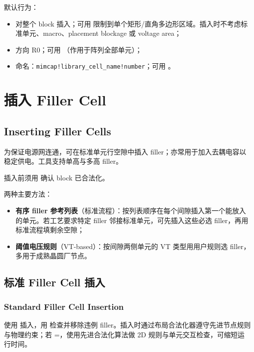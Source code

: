 默认行为：
\begin{itemize}
  \item 对整个 block 插入；可用  限制到单个矩形/直角多边形区域。插入时不考虑标准单元、macro、placement blockage 或 voltage area；
  \item 方向 R0；可用 （作用于阵列全部单元）；
  \item 命名：\texttt{mimcap!library\_cell\_name!number}；可用 。
\end{itemize}

\section{插入 Filler Cell}
\subsection*{Inserting Filler Cells}

为保证电源网连通，可在标准单元行空隙中插入 filler；亦常用于加入去耦电容以稳定供电。工具支持单高与多高 filler。

\begin{noteBox}
插入前须用  确认 block 已合法化。
\end{noteBox}

两种主要方法：
\begin{itemize}
  \item \textbf{有序 filler 参考列表}（标准流程）：按列表顺序在每个间隙插入第一个能放入的单元。若工艺要求特定 filler 邻接标准单元，可先插入这些必选 filler，再用标准流程填剩余空隙；
  \item \textbf{阈值电压规则}（VT-based）：按间隙两侧单元的 VT 类型用用户规则选 filler，多用于成熟晶圆厂节点。
\end{itemize}

\subsection{标准 Filler Cell 插入}
\subsubsection*{Standard Filler Cell Insertion}

使用  插入，用  检查并移除违例 filler。插入时通过布局合法化器遵守先进节点规则与物理约束；若 =，使用先进合法化算法做 2D 规则与单元交互检查，可缩短运行时间。

